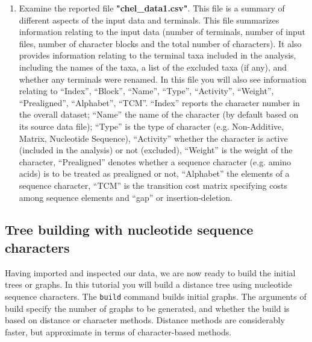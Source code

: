 \documentclass[]{article}
\begin{document}
\begin{enumerate}
\item Examine the reported file \textbf{"chel\_data1.csv"}. This file is a summary 
of different aspects of the input data and terminals. This file summarizes 
information relating to the input data (number of terminals, number of input files, 
number of character blocks and the total number of characters). It also provides
information relating to the terminal taxa included in the analysis, including the 
names of the taxa, a list of the excluded taxa (if any), and whether any terminals 
were renamed. In this file you will also see information relating to 
``Index'', ``Block'', ``Name'', ``Type'', ``Activity'', ``Weight'', ``Prealigned'', ``Alphabet'', 
``TCM''. ``Index'' reports the character number in the overall dataset; ``Name'' the 
name of the character (by default based on its source data file); ``Type'' is the type 
of character (e.g. Non-Additive, Matrix, Nucleotide Sequence), ``Activity'' whether
the character is active (included in the analysis) or not (excluded), ``Weight'' is the 
weight of the character, ``Prealigned''  denotes whether a sequence character 
(e.g. amino acids) is to be treated as prealigned or not, ``Alphabet'' the elements of 
a sequence character, ``TCM'' is the transition cost matrix specifying costs among 
sequence elements and ``gap'' or insertion-deletion.
\end{enumerate}

\subsection{Tree building with nucleotide sequence characters}
\label{subsec:Building}

Having imported and inspected our data, we are now ready to build the initial trees 
or graphs. In this tutorial you will build a distance tree using nucleotide sequence 
characters. The \texttt{build} command builds initial graphs. The arguments of build 
specify the number of graphs to be generated, and whether the build is based on 
distance or character methods. Distance methods are considerably faster, but 
approximate in terms of character-based methods. 
\end{document}
